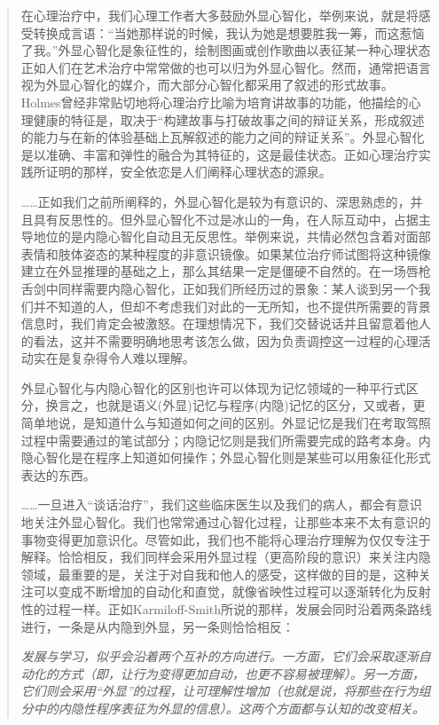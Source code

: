 \blockquote{
在心理治疗中，我们心理工作者大多鼓励外显心智化，举例来说，就是将感受转换成言语：“当她那样说的时候，我认为她是想要胜我一筹，而这惹恼了我。”外显心智化是象征性的，绘制图画或创作歌曲以表征某一种心理状态\pozhehao{}正如人们在艺术治疗中常常做的\pozhehao{}也可以归为外显心智化。然而，通常把语言视为外显心智化的媒介，而大部分心智化都采用了叙述的形式\pozhehao{}故事。Holmes曾经非常贴切地将心理治疗比喻为培育讲故事的功能，他描绘的心理健康的特征是，取决于“构建故事与打破故事之间的辩证关系，形成叙述的能力与在新的体验基础上瓦解叙述的能力之间的辩证关系”。外显心智化是以准确、丰富和弹性的融合为其特征的，这是最佳状态。正如心理治疗实践所证明的那样，安全依恋是人们阐释心理状态的源泉。

……正如我们之前所阐释的，外显心智化是较为有意识的、深思熟虑的，并且具有反思性的。但外显心智化不过是冰山的一角，在人际互动中，占据主导地位的是内隐心智化\pozhehao{}自动且无反思性。举例来说，共情必然包含着对面部表情和肢体姿态的某种程度的非意识镜像。如果某位治疗师试图将这种镜像建立在外显推理的基础之上，那么其结果一定是僵硬不自然的。在一场唇枪舌剑中同样需要内隐心智化，正如我们所经历过的景象：某人谈到另一个我们并不知道的人，但却不考虑我们对此的一无所知，也不提供所需要的背景信息时，我们肯定会被激怒。在理想情况下，我们交替说话并且留意着他人的看法，这并不需要明确地思考该怎么做，因为负责调控这一过程的心理活动实在是复杂得令人难以理解。

外显心智化与内隐心智化的区别也许可以体现为记忆领域的一种平行式区分，换言之，也就是语义(外显)记忆与程序(内隐)记忆的区分，又或者，更简单地说，是知道什么与知道如何之间的区别。外显记忆是我们在考取驾照过程中需要通过的笔试部分；内隐记忆则是我们所需要完成的路考本身。内隐心智化是在程序上知道如何操作；外显心智化则是某些可以用象征化形式表达的东西。

……一旦进入“谈话治疗”，我们这些临床医生以及我们的病人，都会有意识地关注外显心智化。我们也常常通过心智化过程，让那些本来不太有意识的事物变得更加意识化。尽管如此，我们也不能将心理治疗理解为仅仅专注于解释。恰恰相反，我们同样会采用外显过程（更高阶段的意识）来关注内隐领域，最重要的是，关注于对自我和他人的感受，这样做的目的是，这种关注可以变成不断增加的自动化和直觉，就像省映性过程可以逐渐转化为反射性的过程一样。正如Karmiloff-Smith所说的那样，发展会同时沿着两条路线进行，一条是从内隐到外显，另一条则恰恰相反：

\itshape 发展与学习，似乎会沿着两个互补的方向进行。一方面，它们会采取逐渐自动化的方式（即，让行为变得更加自动，也更不容易被理解）。另一方面，它们则会采用“外显”的过程，让可理解性增加（也就是说，将那些在行为组分中的内隐性程序表征为外显的信息）。这两个方面都与认知的改变相关。
}

